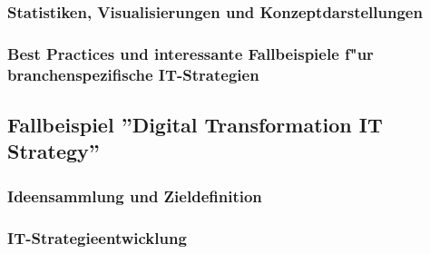 \documentclass[a4paper, 12pt]{article} %
\begin{document}
\subsubsection{Statistiken, Visualisierungen und Konzeptdarstellungen}


\subsubsection{Best Practices und interessante Fallbeispiele f"ur branchenspezifische IT-Strategien}



\subsection{Fallbeispiel ''Digital Transformation IT Strategy''}
\label{subsec:Fallbeispiel}

\subsubsection{Ideensammlung und Zieldefinition}


\subsubsection{IT-Strategieentwicklung}







\end{document}
